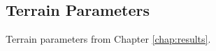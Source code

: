 \begin{landscape}
      \vspace*{\fill}

  \subsection{Terrain Parameters} \label{app:sec:terrain_param}
  
    \begin{table}[H]
    	\newcommand{\splineheight}{1.5em}
    	\newcommand\cincludegraphics[2][]{\raisebox{-0.3\height}{\texttt{[image: \#2]}}}
    	\footnotesize
    	\centering
    	\begin{adjustbox}{center}
    	
    \end{adjustbox}
    	\caption{Terrain parameters from Chapter \ref{chap:results}.}
    	\label{tab:res:terrain_param}
    \end{table}

\end{landscape}